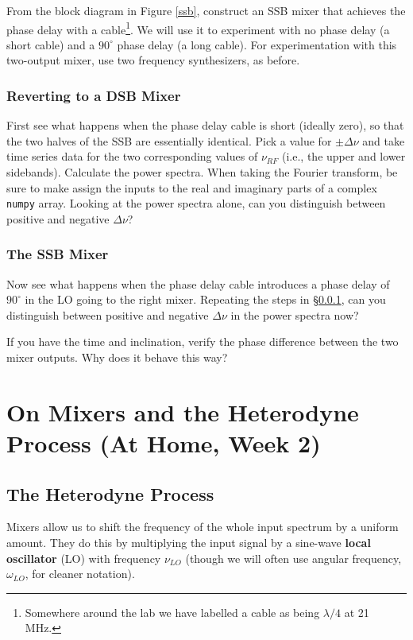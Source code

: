 \documentclass[11pt,preprint]{aastex}
\begin{document}
From the block diagram in Figure \ref{ssb}, construct an SSB mixer that
achieves the phase delay with a cable\footnote{Somewhere around the lab
  we have labelled a cable as being $\lambda/4$ at 21 MHz.}. We will use
it to experiment with no phase delay (a short cable) and a $90^\circ$
phase delay (a long cable).  For experimentation with this two-output
mixer, use two frequency synthesizers, as before.

\subsubsection{Reverting to a DSB Mixer} \label{dsbmixer}

\noindent
First see what happens when the phase delay cable is short (ideally
zero), so that the two halves of the SSB are essentially identical.
Pick a value for $\pm\Delta\nu$ and take time
series data for the two corresponding values of $\nu_{RF}$ (i.e., the
upper and lower sidebands). Calculate the power spectra. When taking the
Fourier transform, be sure to make assign the inputs to the real and imaginary
parts of a complex {\tt numpy} array.
Looking at the power spectra alone, can you distinguish between positive and negative $\Delta
\nu$?

\subsubsection{The SSB Mixer}

\noindent
Now see what happens when the phase delay cable introduces a 
phase delay of $90^\circ$ in the LO going to the right mixer.
Repeating the steps in \S \ref{dsbmixer},
can you distinguish between positive and negative
$\Delta\nu$ in the power spectra now?

If you have the time and inclination, verify the phase difference
between the two mixer outputs.
Why does it behave this way?  







\section {On Mixers and the Heterodyne
  Process (At Home, Week 2)} \label{hetereo}

%
\subsection{The Heterodyne Process}
%
\noindent
Mixers allow us to shift the frequency of the
whole input spectrum by a uniform amount.  They do this by multiplying
the input signal by a sine-wave {\bf local oscillator} (LO) with frequency
$\nu_{LO}$ (though we will often use
angular frequency, $\omega_{LO}$, for cleaner notation).
\end{document}
